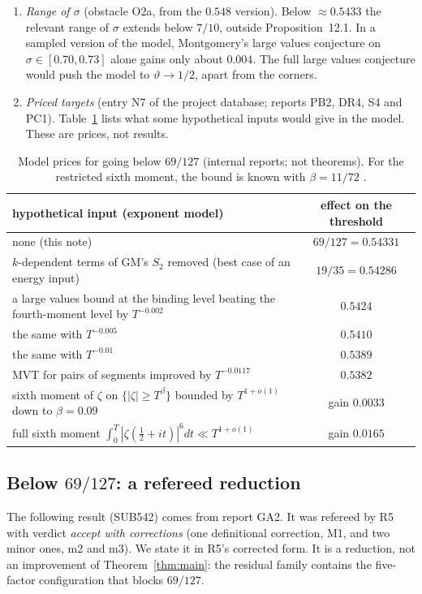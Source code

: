 \documentclass[11pt]{amsart}
\theoremstyle{definition}
\theoremstyle{remark}
\begin{document}
\begin{enumerate}[label=(\alph*),leftmargin=*]
$19/35$ no value of the energy helps, and the energy is not binding at $69/127$.
\item \emph{Range of $\sigma$} (obstacle O2a, from the $0.548$ version). Below $\approx0.5433$ the relevant range of $\sigma$ extends below $7/10$,
outside Proposition~12.1. In a sampled version of the model, Montgomery's large values conjecture on $\sigma\in[0.70,0.73]$ alone gains only
about $0.004$. The full large values conjecture would push the model to $\vartheta\to1/2$, apart from the corners.
\item \emph{Priced targets} (entry N7 of the project database; reports PB2, DR4, S4 and PC1). Table~\ref{tab:prices} lists what some
hypothetical inputs would give in the model. These are prices, not results.
\end{enumerate}

\begin{table}[h]
\centering\small
\begin{tabular}{@{}lc@{}}
\toprule
hypothetical input (exponent model) & effect on the threshold\\
\midrule
none (this note) & $69/127=0.54331$\\
$k$-dependent terms of GM's $S_2$ removed (best case of an energy input) & $19/35=0.54286$\\
a large values bound at the binding level beating the fourth-moment level by $T^{-0.002}$ & $0.5424$\\
\quad the same with $T^{-0.005}$ & $0.5410$\\
\quad the same with $T^{-0.01}$ & $0.5389$\\
MVT for pairs of segments improved by $T^{-0.0117}$ & $0.5382$\\
sixth moment of $\zeta$ on $\{|\zeta|\ge T^{\beta}\}$ bounded by $T^{1+o(1)}$ down to $\beta=0.09$ & gain $0.0033$\\
full sixth moment $\int_0^T|\zeta(\frac12+it)|^6dt\ll T^{1+o(1)}$ & gain $0.0165$\\
\bottomrule
\end{tabular}
\caption{Model prices for going below $69/127$ (internal reports; not theorems). For the restricted sixth moment, the bound is known with
$\beta=11/72$ \cite{TTY}.}\label{tab:prices}
\end{table}

\subsection{Below $69/127$: a refereed reduction}\label{sec:sub542}
The following result (SUB542) comes from report GA2. It was refereed by R5 with verdict \emph{accept with corrections} (one definitional
correction, M1, and two minor ones, m2 and m3). We state it in R5's corrected form. It is a reduction, not an improvement of
Theorem~\ref{thm:main}: the residual family contains the five-factor configuration that blocks $69/127$.
\end{document}
